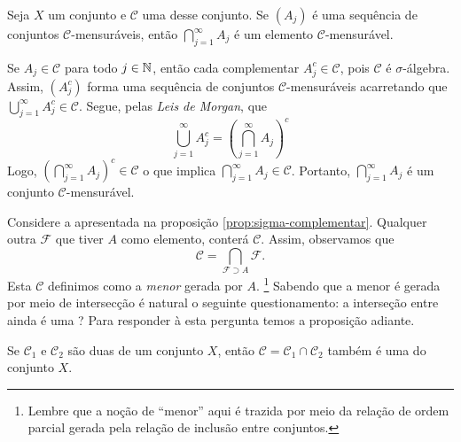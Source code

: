 
\begin{proposition}
\label{prop:interseção-elementos-sigmas}
    Seja $X$ um conjunto e $\mathcal{C}$ uma \sigal desse conjunto.
    Se $(A_j)$ é uma sequência  de conjuntos $\mathcal{C} $-mensuráveis, então $\displaystyle \bigcap_{j = 1}^\infty A_j$ é um elemento $\mathcal{C}$-mensurável.
\end{proposition}
\begin{prova}
    Se $A_j \in \mathcal{C}$ para todo $j \in \operatorname{\mathbb{N}}$, então cada complementar $A_j^c \in \mathcal{C}$, pois $\mathcal{C}$ é $\sigma$-álgebra. 
    Assim, $(A_j^c)$ forma uma sequência de conjuntos $\mathcal{C}$-mensuráveis acarretando que 
    $\displaystyle \bigcup_{j = 1}^\infty A_j^c \in \mathcal{C}$. 
    Segue, pelas \textit{Leis de Morgan}, que 
    $$
    \displaystyle \bigcup_{j = 1}^\infty A_j^c 
    = \left(\displaystyle \bigcap_{j = 1}^\infty A_j\right)^c
  	$$
	Logo, $\left(\displaystyle \bigcap_{j = 1}^\infty A_j\right)^c \in \mathcal{C}$ o que implica $\displaystyle \bigcap_{j = 1}^\infty A_j \in \mathcal{C}$. 
	Portanto, $\displaystyle \bigcap_{j = 1}^\infty A_j$ é um conjunto $\mathcal{C}$-mensurável.
\end{prova}

Considere a \sigal apresentada na proposição \ref{prop:sigma-complementar}. 
Qualquer outra \sigal $\mathcal{F}$ que tiver $A$ como elemento, conterá $\mathcal{C}$.
Assim, observamos que 
$$
\mathcal{C} = \displaystyle \bigcap_{\mathcal{F} \supset A} \mathcal{F}.
$$
Esta \sigal $\mathcal{C}$   definimos como a \textit{menor} \sigal gerada por $A$. 
%
\footnote{Lembre que a noção de \enquote{menor} aqui é trazida por meio da relação de ordem parcial gerada pela relação de inclusão entre conjuntos.}
%
Sabendo que a menor \sigal é gerada por meio de intersecção é natural o seguinte questionamento: a interseção entre \sigals ainda é uma \sigal? Para responder à esta pergunta temos a proposição adiante.

\begin{proposition}
\label{prop:interseção-2sigmas}
    Se $\mathcal{C}_1$ e $\mathcal{C}_2$ são duas \sigals de um conjunto $X$, então $\mathcal{C} = \mathcal{C}_1 \cap \mathcal{C}_2$ também é uma \sigal do conjunto $X$.
\end{proposition}

